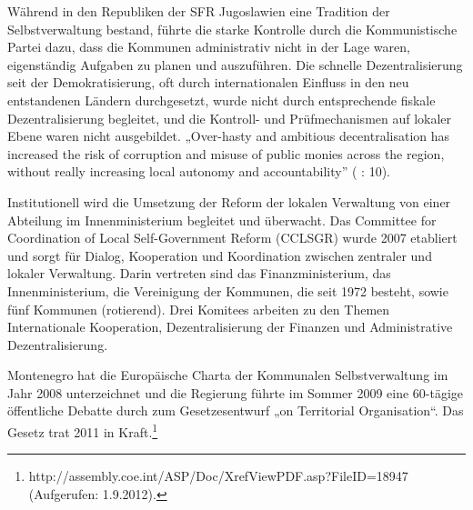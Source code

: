Während in den Republiken der SFR Jugoslawien eine Tradition der Selbstverwaltung bestand, führte die starke Kontrolle durch die Kommunistische Partei dazu, dass die Kommunen administrativ nicht in der Lage waren, eigenständig Aufgaben zu planen und auszuführen. Die schnelle Dezentralisierung seit der Demokratisierung, oft durch internationalen Einfluss in den neu entstandenen Ländern durchgesetzt, wurde nicht durch entsprechende fiskale Dezentralisierung begleitet, und die Kontroll- und Prüfmechanismen auf lokaler Ebene waren nicht ausgebildet. „Over-hasty and ambitious decentralisation has increased the risk of corruption and misuse of public monies across the region, without really increasing local autonomy and accountability” (\cite{oecd04} : 10).\par
Institutionell wird die Umsetzung der Reform der lokalen Verwaltung von einer Abteilung im Innenministerium begleitet und überwacht. Das Committee for Coordination of Local Self-Government Reform (CCLSGR) wurde 2007 etabliert und sorgt für Dialog, Kooperation und Koordination zwischen zentraler und lokaler Verwaltung. Darin vertreten sind das Finanzministerium, das Innenministerium, die Vereinigung der Kommunen, die seit 1972 besteht, sowie fünf Kommunen (rotierend). Drei Komitees arbeiten zu den Themen Internationale Kooperation, Dezentralisierung der Finanzen und Administrative Dezentralisierung. \par
Montenegro hat die Europäische Charta der Kommunalen Selbstverwaltung im Jahr 2008 unterzeichnet und die Regierung führte im Sommer 2009 eine 60-tägige öffentliche Debatte durch zum Gesetzesentwurf „on Territorial Organisation“. Das Gesetz trat 2011 in Kraft.\footnote{http://assembly.coe.int/ASP/Doc/XrefViewPDF.asp?FileID=18947 (Aufgerufen: 1.9.2012).} 


